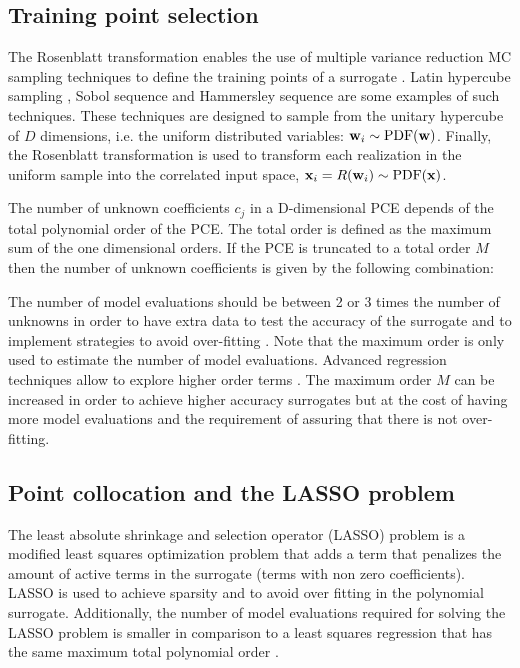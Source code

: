 \documentclass[preprint,12pt]{elsarticle}
\begin{document}

\subsection{Training point selection}

The Rosenblatt transformation enables the use of multiple variance reduction MC sampling techniques to define the training points of a surrogate \cite{feinberg2015chaospy}. Latin hypercube sampling \cite{mckay2000comparison}, Sobol sequence \cite{sobol1967distribution} and Hammersley sequence \cite{hammersley1960monte} are some examples of such techniques. These techniques are designed to sample from the unitary hypercube of $D$ dimensions, i.e. the uniform distributed variables: $\mathbf{w}_i \sim \mathrm{PDF}(\mathbf{w})$. Finally, the Rosenblatt transformation is used to transform each realization in the uniform sample into the correlated input space, $\mathbf{x}_i = R(\mathbf{w}_i) \sim \mathrm{PDF}(\mathbf{x})$.

The number of unknown coefficients $c_j$ in a D-dimensional PCE depends of the total polynomial order of the PCE. The total order is defined as the maximum sum of the one dimensional orders. If the PCE is truncated to a total order $M$ then the number of unknown coefficients is given by the following combination:


The number of model evaluations should be between 2 or 3 times the number of unknowns in order to have extra data to test the accuracy of the surrogate and to implement strategies to avoid over-fitting \cite{blatman2011adaptive}. Note that the maximum order is only used to estimate the number of model evaluations. Advanced regression techniques allow to explore higher order terms \cite{tibshirani1996regression, blatman2011adaptive}. The maximum order $M$ can be increased in order to achieve higher accuracy surrogates but at the cost of having more model evaluations and the requirement of assuring that there is not over-fitting.

\subsection{Point collocation and the LASSO problem}
\label{sec_LASSO}

The least absolute shrinkage and selection operator (LASSO) problem is a modified least squares optimization problem that adds a term that penalizes the amount of active terms in the surrogate (terms with non zero coefficients). LASSO is used to achieve sparsity and to avoid over fitting in the polynomial surrogate. Additionally, the number of model evaluations required for solving the LASSO problem is smaller in comparison to a least squares regression that has the same maximum total polynomial order \cite{blatman2011adaptive}.
\end{document}
